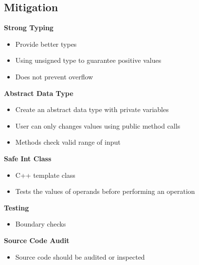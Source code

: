 \subsection{Mitigation}
\textbf{Strong Typing}
\begin{itemize}
    \item Provide better types
    \item Using unsigned type to guarantee positive values
    \item Does not prevent overflow
\end{itemize}
\textbf{Abstract Data Type}
\begin{itemize}
    \item Create an abstract data type with private variables
    \item User can only changes values using public method calls
    \item Methods check valid range of input
\end{itemize}
\textbf{Safe Int Class}
\begin{itemize}
    \item C++ template class
    \item Tests the values of operands before performing an operation
\end{itemize}
\textbf{Testing}
\begin{itemize}
    \item Boundary checks
\end{itemize}
\textbf{Source Code Audit}
\begin{itemize}
    \item Source code should be audited or inspected
\end{itemize}